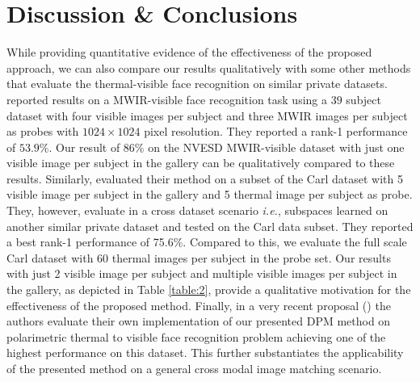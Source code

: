 \documentclass[smallextended,natbib]{svjour3}       \usepackage{graphicx}
\newcommand{\ie}{\emph{i.e.}}
\begin{document}
\section{Discussion \& Conclusions}
\label{Disc}
While providing quantitative evidence of the effectiveness of the proposed approach, we can also compare our results qualitatively with some other methods that evaluate the thermal-visible face recognition on similar private datasets. \citep{bourlai2012} reported results on a MWIR-visible face recognition task using a $39$ subject dataset with four visible images per subject and three MWIR images per subject as probes with $1024\times1024$ pixel resolution. They reported a rank-1 performance of $53.9\%$. Our result of 86\% on the NVESD MWIR-visible dataset with just one visible image per subject in the gallery can be qualitatively compared to these results. Similarly, \cite{Chen2015} evaluated their method on a subset of the Carl dataset with 5 visible image per subject in the gallery and 5 thermal image per subject as probe. They, however, evaluate in a cross dataset scenario \ie, subspaces learned on another similar private dataset and tested on the Carl data subset. They reported a best rank-1 performance of 75.6\%. Compared to this, we evaluate the full scale Carl dataset with 60 thermal images per subject in the probe set. Our results with just 2 visible image per subject and multiple visible images per subject in the gallery, as depicted in Table \ref{table:2}, provide a qualitative motivation for the effectiveness of the proposed method. Finally, in a very recent proposal (\cite{Riggen2016}) the authors evaluate their own implementation of our presented DPM method on polarimetric thermal to visible face recognition problem achieving one of the highest performance on this dataset. This further substantiates the applicability of the presented method on a general cross modal image matching scenario. 
\end{document}
